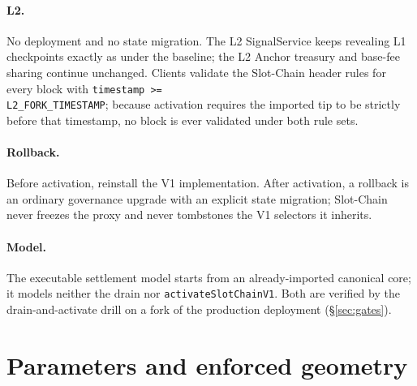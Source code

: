 \documentclass[a4paper,11pt]{article}
\newcommand{\code}[1]{\nolinkurl{#1}}
\begin{document}
\paragraph{L2.}  No deployment and no state migration.  The L2 SignalService
keeps revealing L1 checkpoints exactly as under the baseline; the L2 Anchor
treasury and base-fee sharing continue unchanged.  Clients validate the
Slot-Chain header rules for every block with \code{timestamp >=
L2_FORK_TIMESTAMP}; because activation requires the imported tip to be
strictly before that timestamp, no block is ever validated under both rule
sets.

\paragraph{Rollback.}  Before activation, reinstall the V1 implementation.
After activation, a rollback is an ordinary governance upgrade with an explicit
state migration; Slot-Chain never freezes the proxy and never tombstones the
V1 selectors it inherits.

\paragraph{Model.}  The executable settlement model starts from an
already-imported canonical core; it models neither the drain nor
\code{activateSlotChainV1}.  Both are verified by the drain-and-activate
drill on a fork of the production deployment (\S\ref{sec:gates}).

\section{Parameters and enforced geometry}\label{sec:parameters}
\end{document}
